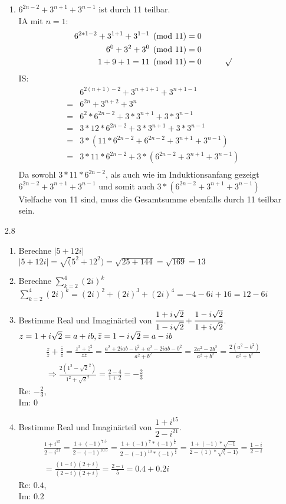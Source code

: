 \documentclass[12pt,letterpaper]{article}
\newcommand{\alignleft}[1]{\tag*{\llap{\makebox[\linewidth][l]{$#1$}}}}
\newcommand{\LLeftrightarrow}{ \alignleft{\Leftrightarrow}}
\newcommand{\Eqn}[3]{#1 &#2 #3}
\newcommand{\eqnf}[2]{\Eqn{#1}{=}{#2}\\}
\newcommand{\eqn}[2]{\LLeftrightarrow\Eqn{#1}{=}{#2}\\}
\begin{document}
\begin{enumerate}
\begin{enumerate}
\item $6^{2n-2}+3^{n+1}+3^{n-1}$ ist durch 11 teilbar.\\
IA mit $n=1$: 
\begin{align*}
\eqnf{6^{2*1-2}+3^{1+1}+3^{1-1} \pmod{11}}{0}
\eqn{6^0+3^2+3^0 \pmod{11}}{0}
\eqn{1+9+1 = 11 \pmod{11}}{0\makebox[1cm]{}\surd}
\end{align*}
IS:
\begin{align*}
&6^{2(n+1)-2}+3^{n+1+1}+3^{n+1-1}\\
= &6^{2n}+3^{n+2}+3^{n}\\
= &6^2*6^{2n-2}+3*3^{n+1}+3*3^{n-1}\\ 
= &3*12*6^{2n-2}+3*3^{n+1}+3*3^{n-1}\\
= &3*(11*6^{2n-2}+6^{2n-2}+3^{n+1}+3^{n-1})\\
= &3*11*6^{2n-2}+ 3*(6^{2n-2}+3^{n+1}+3^{n-1})\\
\end{align*}
Da sowohl $3*11*6^{2n-2}$, als auch wie im Induktionsanfang gezeigt $6^{2n-2}+3^{n+1}+3^{n-1}$ und somit auch $3*(6^{2n-2}+3^{n+1}+3^{n-1})$ Vielfache von 11 sind, muss die Gesamtsumme ebenfalls durch 11 teilbar sein.
\end{enumerate}
\item [2.8]
\begin{enumerate}
\item Berechne $|5+12i|$\\
$|5+12i| = \sqrt(5^2+12^2) = \sqrt{25+144} = \sqrt{169} = 13$
\item Berechne $\sum\limits_{k=2}^{4}(2i)^k$\\
$\sum\limits_{k=2}^{4}(2i)^k = (2i)^2+(2i)^3+(2i)^4 = -4-6i+16 = 12-6i$
\item Bestimme Real und Imaginärteil von $\cfrac{1+i\sqrt{2}}{1-i\sqrt{2}}+\cfrac{1-i\sqrt{2}}{1+i\sqrt{2}}$.\\
$z = 1+i\sqrt{2} = a+ib,\\
\bar{z} = 1-i\sqrt{2} = a-ib$
\begin{align*}
\frac{z}{\bar{z}}+\frac{\bar{z}}{z} = \frac{z^2+\bar{z}^2}{z\bar{z}} = \frac{a^2+2iab-b^2+a^2-2iab-b^2}{a^2+b^2} = \frac{2a^2-2b^2}{a^2+b^2} = \frac{2(a^2-b^2)}{a^2+b^2}\\
\Rightarrow\frac{2(1^2-\sqrt{2}^2)}{1^2+\sqrt{2}^2}=\frac{2-4}{1+2} = -\frac{2}{3}
\end{align*}
Re: $-\frac{2}{3}$,\\
Im: $0$
\item Bestimme Real und Imaginärteil von $\dfrac{1+i^{15}}{2-i^{21}}$.
\begin{align*}
\frac{1+i^{15}}{2-i^{21}} = \frac{1+(-1)^{7.5}}{2-(-1)^{10.5}} = \frac{1+(-1)^7*(-1)^{\frac{1}{2}}}{2-(-1)^{10}*(-1)^{\frac{1}{2}}} = \frac{1+(-1)*\sqrt{-1}}{2-(1)*\sqrt(-1)} = \frac{1-i}{2-i}\\
=\frac{(1-i)(2+i)}{(2-i)(2+i)} = \frac{2-i}{5} = 0.4+0.2i
\end{align*}
Re: $0.4$,\\
Im: $0.2$
\end{enumerate}
\end{enumerate}
\end{document}
